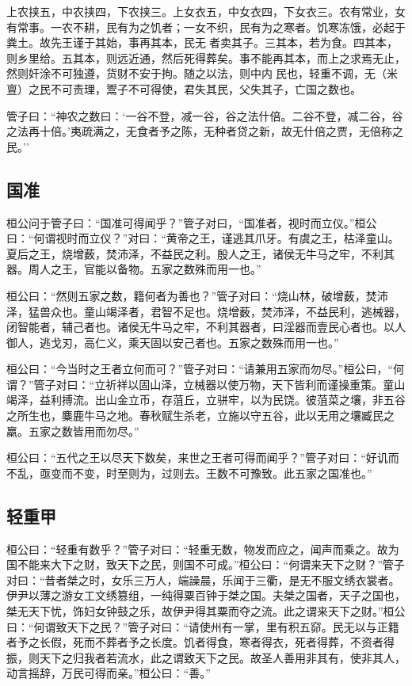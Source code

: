 \documentclass[]{article}
\begin{document}
上农挟五，中农挟四，下农挟三。上女衣五，中女衣四，下女衣三。农有常业，女有常事。一农不耕，民有为之饥者；一女不织，民有为之寒者。饥寒冻饿，必起于粪土。故先王谨于其始，事再其本，民无者卖其子。三其本，若为食。四其本，则乡里给。五其本，则远近通，然后死得葬矣。事不能再其本，而上之求焉无止，然则奸涂不可独遵，货财不安于拘。随之以法，则中内民也，轻重不调，无（米亶）之民不可责理，鬻子不可得使，君失其民，父失其子，亡国之数也。

管子曰：``神农之数曰：`一谷不登，减一谷，谷之法什倍。二谷不登，减二谷，谷之法再十倍。'夷疏满之，无食者予之陈，无种者贷之新，故无什倍之贾，无倍称之民。''

\hypertarget{header-n1048}{%
\subsection{国准}\label{header-n1048}}

桓公问于管子曰：``国准可得闻乎？''管子对曰，``国准者，视时而立仪。''桓公曰：``何谓视时而立仪？''对曰：``黄帝之王，谨逃其爪牙。有虞之王，枯泽童山。夏后之王，烧增薮，焚沛泽，不益民之利。殷人之王，诸侯无牛马之牢，不利其器。周人之王，官能以备物。五家之数殊而用一也。''

桓公曰：``然则五家之数，籍何者为善也？''管子对曰：``烧山林，破增薮，焚沛泽，猛兽众也。童山竭泽者，君智不足也。烧增薮，焚沛泽，不益民利，逃械器，闭智能者，辅己者也。诸侯无牛马之牢，不利其器者，曰淫器而壹民心者也。以人御人，逃戈刃，高仁义，乘天固以安己者也。五家之数殊而用一也。''

桓公曰：``今当时之王者立何而可？''管子对曰：``请兼用五家而勿尽。''桓公曰，``何谓？''管子对曰：``立祈祥以固山泽，立械器以使万物，天下皆利而谨操重策。童山竭泽，益利搏流。出山金立币，存菹丘，立骈牢，以为民饶。彼菹菜之壤，非五谷之所生也，麋鹿牛马之地。春秋赋生杀老，立施以守五谷，此以无用之壤臧民之羸。五家之数皆用而勿尽。''

桓公曰：``五代之王以尽天下数矣，来世之王者可得而闻乎？''管子对曰：``好讥而不乱，亟变而不变，时至则为，过则去。王数不可豫致。此五家之国准也。''

\hypertarget{header-n1055}{%
\subsection{轻重甲}\label{header-n1055}}

桓公曰：``轻重有数乎？''管子对曰：``轻重无数，物发而应之，闻声而乘之。故为国不能来大下之财，致天下之民，则国不可成。''桓公曰：``何谓来天下之财？''管子对曰：``昔者桀之时，女乐三万人，端譟晨，乐闻于三衢，是无不服文绣衣裳者。伊尹以薄之游女工文绣篡组，一纯得粟百钟于桀之国。夫桀之国者，天子之国也，桀无天下忧，饰妇女钟鼓之乐，故伊尹得其粟而夺之流。此之谓来天下之财。''桓公曰：``何谓致天下之民？''管子对曰：``请使州有一掌，里有积五窌。民无以与正籍者予之长假，死而不葬者予之长度。饥者得食，寒者得衣，死者得葬，不资者得振，则天下之归我者若流水，此之谓致天下之民。故圣人善用非其有，使非其人，动言摇辞，万民可得而亲。''桓公曰：``善。''
\end{document}
